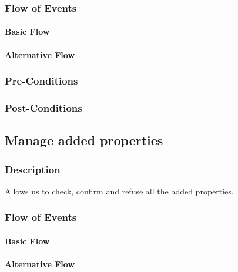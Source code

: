 \documentclass[a4paper,12pt]{article}
\begin{document}
\subsubsection{Flow of Events}
\paragraph{Basic Flow}
\begin{itemize}
\end{itemize}

\paragraph{Alternative Flow}
\begin{itemize}
\end{itemize}

\subsubsection{Pre-Conditions}
\subsubsection{Post-Conditions}

\subsection{Manage added properties}
\subsubsection{Description}
Allows us to check, confirm and refuse all the added properties.
\subsubsection{Flow of Events}
\paragraph{Basic Flow}
\begin{itemize}
\end{itemize}

\paragraph{Alternative Flow}
\begin{itemize}
\end{itemize}
\end{document}
